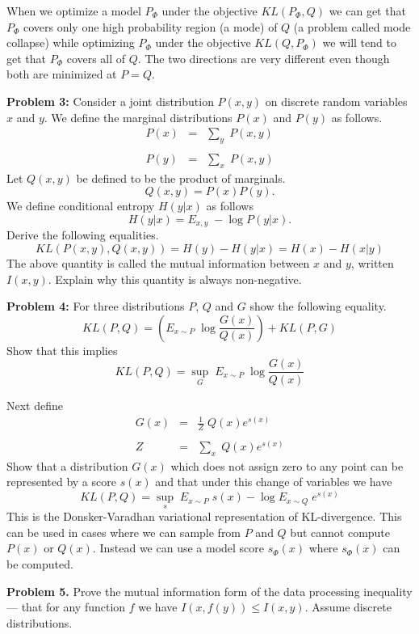\documentclass{article}
\begin{document}
When we optimize a model $P_\Phi$ under the objective $KL(P_\Phi,Q)$ we can get that $P_\Phi$ covers only one high probability region (a mode) of $Q$ (a problem called mode collapse)
while optimizing $P_\Phi$ under the objective $KL(Q,P_\Phi)$ we will tend to get that $P_\Phi$ covers all of $Q$.  The two directions are very different even though both
are minimized at $P = Q$.

\bigskip
{\bf Problem 3:} Consider a joint distribution $P(x,y)$ on discrete random variables $x$ and $y$.
We define the marginal distributions $P(x)$ and $P(y)$ as follows.
\begin{eqnarray*}
  P(x) & = & \sum_y\;P(x,y) \\
  \\
  P(y) & = & \sum_x\;P(x,y)
\end{eqnarray*}
Let $Q(x,y)$ be defined to be the product of marginals.
$$Q(x,y) = P(x)P(y).$$
We define conditional entropy $H(y|x)$ as follows
$$H(y|x) = E_{x,y} \;-\log P(y|x).$$
Derive the following equalities.
$$KL(P(x,y),Q(x,y)) = H(y) - H(y|x) = H(x) - H(x|y)$$
The above quantity is called the mutual information between $x$ and $y$, written $I(x,y)$.
Explain why this quantity is always non-negative.
    
\bigskip
{\bf Problem 4:}
For three distributions $P$, $Q$ and $G$ show the following equality.
$$KL(P,Q) =  \left(E_{x \sim P} \;\log \frac{G(x)}{Q(x)}\right) + KL(P,G)$$
Show that this implies
$$KL(P,Q) =  \sup_G \;E_{x \sim P}\; \log \frac{G(x)}{Q(x)}$$

Next define
\begin{eqnarray*}
  G(x) & = & \frac{1}{Z}\;Q(x)e^{s(x)} \\
  \\
  Z & = & \sum_x \;Q(x)e^{s(x)}
\end{eqnarray*}
Show that a distribution $G(x)$ which does not assign zero to any point can be represented by a score $s(x)$ and that under this
change of variables we have
$$KL(P,Q) =  \sup_s \;E_{x \sim P}\; s(x) - \log E_{x \sim Q} \;e^{s(x)}$$
This is the Donsker-Varadhan variational representation of KL-divergence.
This can be used in cases where we can sample from $P$ and $Q$ but cannot compute $P(x)$ or $Q(x)$.
Instead we can use a model score $s_\Phi(x)$ where $s_\Phi(x)$ can be computed.
    
\bigskip
{\bf Problem 5.} Prove the mutual information form of the data processing inequality --- that for any function $f$ we have $I(x,f(y)) \leq I(x,y)$.  Assume
discrete distributions.
\end{document}
